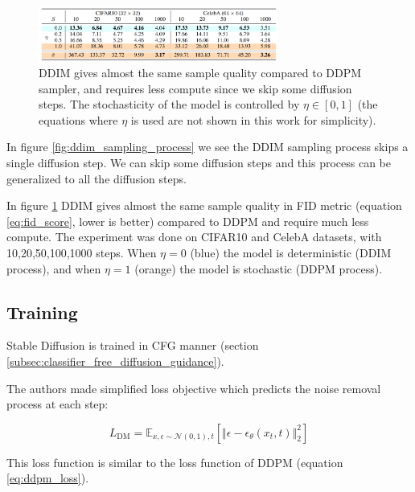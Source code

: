 \begin{figure}
    \centering
    \includegraphics[width=0.7\textwidth]{images/diffusion_models/stable_diffusion/ddim_sample_quality.png}
    \caption{DDIM gives almost the same sample quality compared to DDPM sampler, and requires less compute since we skip some diffusion steps. The stochasticity of the model is controlled by $\eta \in [0, 1]$ \cite{ddim} (the equations where $\eta$ is used are not shown in this work for simplicity).}
    \label{fig:ddim_sample_quality}
\end{figure}

In figure \ref{fig:ddim_sampling_process} we see the DDIM sampling process skips a single diffusion step. We can skip some diffusion steps and this process can be generalized to all the diffusion steps.

In figure \ref{fig:ddim_sample_quality} DDIM gives almost the same sample quality in FID metric (equation \ref{eq:fid_score}, lower is better) compared to DDPM and require much less compute. The experiment was done on CIFAR10 and CelebA datasets, with 10,20,50,100,1000 steps. When $\eta = 0$ (blue) the model is deterministic (DDIM process), and when $\eta = 1$ (orange) the model is stochastic (DDPM process).















\subsection{Training}

Stable Diffusion is trained in CFG manner (section \ref{subsec:classifier_free_diffusion_guidance}).

The authors made simplified loss objective which predicts the noise removal process at each step:

\[
    L_{\text{DM}} = \mathbb{E}_{x, \epsilon \sim \mathcal{N} (0, 1), t} \left[ \Vert \epsilon - \epsilon_\theta(x_t, t) \Vert _2^2 \right]
\]

This loss function is similar to the loss function of DDPM (equation \ref{eq:ddpm_loss}).













